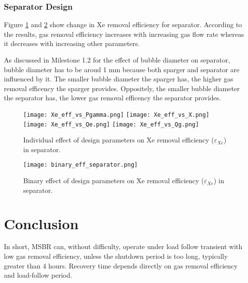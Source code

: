 \newpage
\FloatBarrier

\subsubsection{Separator Design}

    Figure \ref{fig:individual_eff_separator} and \ref{fig:binary_eff_separator}
    show change in Xe removal efficiency for separator. According to the
    results, gas removal efficiency increases with increasing gas flow rate
    whereas it decreases with increasing other parameters.

    As discussed in Milestone 1.2 for the effect of bubble diameter on separator, bubble diameter has to be aroud 1 mm because both sparger and separator are influenced by it. The smaller bubble diameter the sparger has, the higher gas removal efficency the sparger provides. Oppositely, the smaller bubble diameter the separator has, the lower gas removal efficency the separator provides.

\begin{figure}[htbp!]
    \begin{center}
        \texttt{[image: Xe\_eff\_vs\_Pgamma.png]}
        \texttt{[image: Xe\_eff\_vs\_X.png]}
        \texttt{[image: Xe\_eff\_vs\_Qe.png]}
        \texttt{[image: Xe\_eff\_vs\_Qg.png]}
    \end{center}
    \caption{Individual effect of design parameters on Xe removal
    efficiency
        ($\varepsilon$$_{Xe}$) in separator.}
    \label{fig:individual_eff_separator}
\end{figure}

\begin{figure}[htbp!]
    \begin{center}
        \texttt{[image: binary\_eff\_separator.png]}
    \end{center}
    \caption{Binary effect of design parameters on Xe removal
    efficiency
        ($\varepsilon$$_{Xe}$) in separator.}
    \label{fig:binary_eff_separator}
\end{figure}

\newpage
\FloatBarrier

\section{Conclusion}

    In short, MSBR can, without difficulty, operate under load follow transient
    with low gas removal efficiency, unless the shutdown period is too long,
    typically greater than 4 hours. Recovery time depends directly on gas
    removal efficiency and load-follow period.

